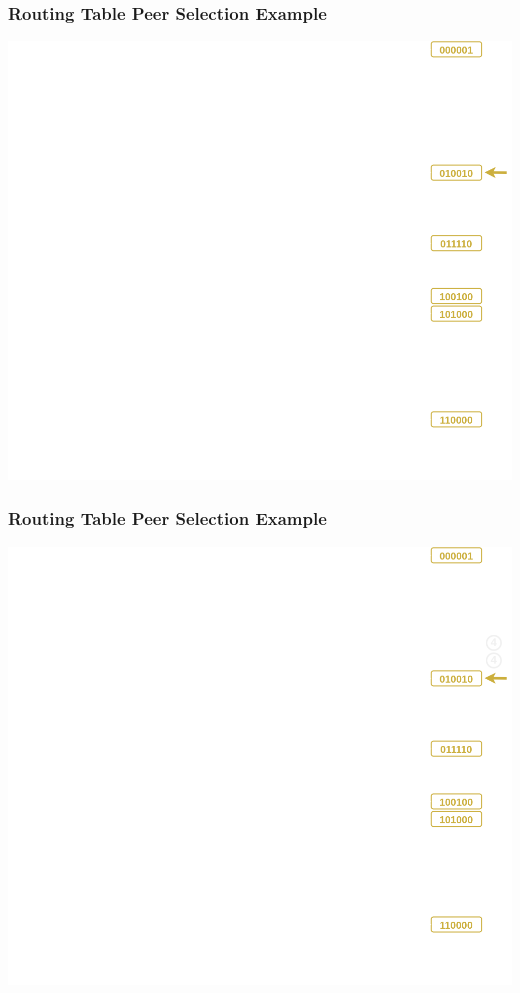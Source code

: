 \documentclass{../pl-slide}
\begin{document}
\begin{frame}
\frametitle{Routing Table Peer Selection Example}
\begin{center}
	\includegraphics[scale=.23]{resources/trie-features.png}
\end{center}
\end{frame}

\begin{frame}
\frametitle{Routing Table Peer Selection Example}
\begin{center}
	\includegraphics[scale=.23]{resources/trie-features-bucket4.png}
\end{center}
\end{frame}
\end{document}
